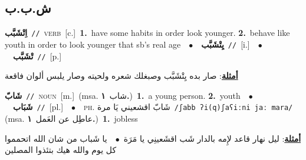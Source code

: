 \documentclass[10pt,a4paper,twoside]{article} %
\begin{document}
\begin{multicols}{2}
{{{{\vspace{-3mm}
\subsection*{\color{blue}\foreignlanguage{arabic}{ش.ب.ب}\color{blue}{}} 

{\setlength\topsep{0pt}\textbf{\foreignlanguage{arabic}{اِتْشَبَّب}}\ {\color{gray}\texttt{//}\color{black}}\ \textsc{verb}\ [c.]\ \textbf{1.}~have some habits in order look younger.  \textbf{2.}~behave like youth in order to look younger that sb's real age\ \ $\bullet$\ \ \setlength\topsep{0pt}\textbf{\foreignlanguage{arabic}{يِتْشَبَّب}}\ {\color{gray}\texttt{//}\color{black}}\ [i.]\ \ $\bullet$\ \ \setlength\topsep{0pt}\textbf{\foreignlanguage{arabic}{تْشَبَّب}}\ {\color{gray}\texttt{//}\color{black}}\ [p.]\  \begin{flushright}\color{gray}\foreignlanguage{arabic}{\textbf{\underline{\foreignlanguage{arabic}{أمثلة}}}: صار بده يِتْشَبَّب وصبغلك شعره ولحيته وصار يلبس ألوان فاقعة}\end{flushright}\color{black}} \vspace{2mm}

{\setlength\topsep{0pt}\textbf{\foreignlanguage{arabic}{شَابّ}}\ {\color{gray}\texttt{//}\color{black}}\ \textsc{noun}\ [m.]\ \color{gray}(msa. \foreignlanguage{arabic}{شاب}~\foreignlanguage{arabic}{\textbf{١.}})\color{black}\ \textbf{1.}~a young person.  \textbf{2.}~youth\ \ $\bullet$\ \ \setlength\topsep{0pt}\textbf{\foreignlanguage{arabic}{شَبَاب}}\ {\color{gray}\texttt{//}\color{black}}\ [pl.]\ \ $\bullet$\ \ \textsc{ph.} \color{gray} \foreignlanguage{arabic}{شَابّ اقشعيني يَا مرة}\color{black}\ {\color{gray}\texttt{/{\sffamily ʃabb ʔi(q)ʃaʕiːni jaː mara}/}\color{black}}\ \color{gray} (msa. \foreignlanguage{arabic}{عاطِل عن العَمل}~\foreignlanguage{arabic}{\textbf{١.}})\color{black}\ \textbf{1.}~jobless\  \begin{flushright}\color{gray}\foreignlanguage{arabic}{\textbf{\underline{\foreignlanguage{arabic}{أمثلة}}}: ليل نهار قاعد لإِمه بالدار شَب اقشَعينِي يا مَرَة\ $\bullet$\ \  يا شَباب من شان الله اتحمموا كل يوم والله هيك بتئذوا المصلين}\end{flushright}\color{black}} \vspace{2mm}

}}}}
\end{multicols}
\end{document}
